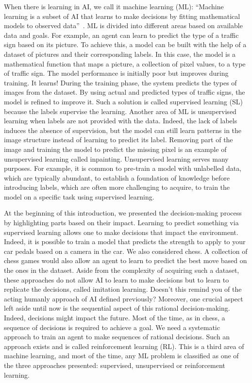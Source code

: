When there is learning in AI, we call it machine learning (ML): ``Machine learning is a subset of AI that learns to make decisions by fitting mathematical models to observed data''~\citep{prince2023understanding}.
ML is divided into different areas based on available data and goals.
For example, an agent can learn to predict the type of a traffic sign based on its picture.
To achieve this, a model can be built with the help of a dataset of pictures and their corresponding labels.
In this case, the model is a mathematical function that maps a picture, a collection of pixel values, to a type of traffic sign.
The model performance is initially poor but improves during training. 
It learns!
During the training phase, the system predicts the types of images from the dataset.
By using actual and predicted types of traffic signs, the model is refined to improve it.
Such a solution is called supervised learning (SL) because the labels supervise the learning.
Another area of ML is unsupervised learning when labels are not provided with the data.
Indeed, the lack of labels induces the absence of supervision, but the model can still learn patterns in the image structure instead of learning to predict its label.
Removing part of the image and training the model to predict the missing pixel is an example of unsupervised learning called inpainting.
Unsupervised learning serves many purposes.
For example, it is common to pre-train a model with unlabelled data, which are typically abundant, to establish a foundation of knowledge before introducing labels, which are often more challenging to acquire, to train the model on a specific task using supervised learning.

At the beginning of this introduction, we presented the decision-making process by highlighting parts based on their impact.
Learning to predict something via supervised learning allows one to make decisions that impact the environment.
Indeed, it is possible to train a model that predicts the strength to apply to your car pedals based on a camera in the car.
We also considered chess.
A collection of chess games would also allow an agent to learn to predict the best move based on the ones in the dataset.
Aside from the complexity of acquiring such a dataset, these approaches do not allow AI to learn to make decisions but to learn to replicate the decisions, called imitation learning.
Doesn't this remind you of the acting humanly approach of AI defined previously?
Moreover, one crucial aspect left aside until now is the sequential aspect of this rational decision-making.
Indeed, decisions might impact the future.
Most of the time, as in chess, a sequence of decisions is required to achieve a goal.
We need a systematic approach to train an agent to make sequences of rational decisions.
Such an approach exists and is called reinforcement learning (RL).
This is a third area of machine learning, and most of the time, any ML problem is classified as one of the three approaches presented: supervised, unsupervised or reinforcement learning.

